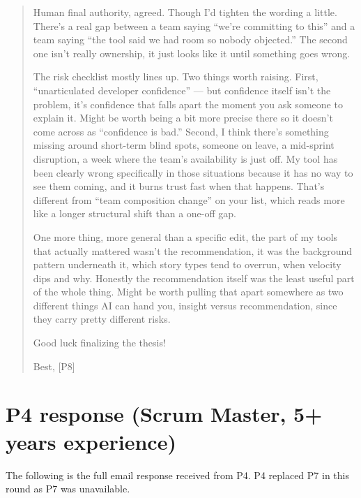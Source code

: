 \documentclass[a4paper,twoside]{bth}
\begin{document}
\begin{quote}
Human final authority, agreed. Though I'd tighten the wording a little. There's a real gap between a team saying ``we're committing to this'' and a team saying ``the tool said we had room so nobody objected.'' The second one isn't really ownership, it just looks like it until something goes wrong.

The risk checklist mostly lines up. Two things worth raising. First, ``unarticulated developer confidence'' --- but confidence itself isn't the problem, it's confidence that falls apart the moment you ask someone to explain it. Might be worth being a bit more precise there so it doesn't come across as ``confidence is bad.'' Second, I think there's something missing around short-term blind spots, someone on leave, a mid-sprint disruption, a week where the team's availability is just off. My tool has been clearly wrong specifically in those situations because it has no way to see them coming, and it burns trust fast when that happens. That's different from ``team composition change'' on your list, which reads more like a longer structural shift than a one-off gap.

One more thing, more general than a specific edit, the part of my tools that actually mattered wasn't the recommendation, it was the background pattern underneath it, which story types tend to overrun, when velocity dips and why. Honestly the recommendation itself was the least useful part of the whole thing. Might be worth pulling that apart somewhere as two different things AI can hand you, insight versus recommendation, since they carry pretty different risks.

Good luck finalizing the thesis!

Best,
[P8]
\end{quote}

\section*{P4 response (Scrum Master, 5+ years experience)}

The following is the full email response received from P4. P4 replaced P7 in this round as P7 was unavailable.
\end{document}

